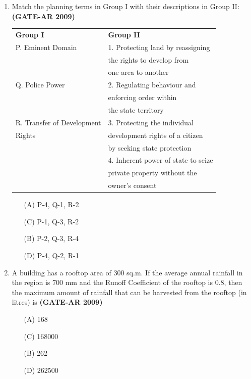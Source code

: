 \documentclass[a4paper,10pt]{article}
\begin{document}
\begin{enumerate}[label=Q.\arabic]
    \item Match the planning terms in Group I with their descriptions in Group II: \textbf{(GATE-AR 2009)} \\
    \begin{tabular}{ l l }
	\textbf{Group I} & \textbf{Group II} \\
	P. Eminent Domain & 1. Protecting land by reassigning \\
	& the rights to develop from \\
	& one area to another \\
	Q. Police Power & 2. Regulating behaviour and \\
	& enforcing order within \\
	& the state territory \\
	R. Transfer of Development & 3. Protecting the individual \\
	Rights & development rights of a citizen \\
	& by seeking state protection \\
	& 4. Inherent power of state to seize \\
	& private property without the \\
	& owner’s consent \\
	\end{tabular}
	\begin{multicols}{2}
	\begin{itemize}
        \item[(A)] P-4, Q-1, R-2
        \item[(C)] P-1, Q-3, R-2
        \item[(B)] P-2, Q-3, R-4
        \item[(D)] P-4, Q-2, R-1
    \end{itemize}
	\end{multicols}

    \item A building has a rooftop area of 300 sq.m. If the average annual rainfall in the region is 700 mm and the Runoff Coefficient of the rooftop is 0.8, then the maximum amount of rainfall that can be harvested from the rooftop (in litres) is \textbf{(GATE-AR 2009)}
    \begin{multicols}{2}
	\begin{itemize}
        \item[(A)] 168
        \item[(C)] 168000
        \item[(B)] 262
        \item[(D)] 262500
    \end{itemize}
	\end{multicols}


\end{enumerate}
\end{document}

